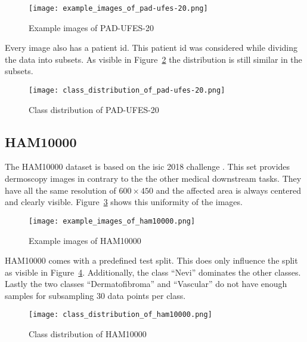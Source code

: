 \begin{figure}[H]
    \begin{center}
    \texttt{[image: example\_images\_of\_pad-ufes-20.png]}
    \caption{Example images of PAD-UFES-20}\label{fig:example_images_of_pad-ufes-20}
    \end{center}
\end{figure}

Every image also has a patient id. This patient id was considered while dividing the data into subsets. 
As visible in Figure~\ref{fig:class_distribution_of_pad-ufes-20} the distribution is still similar in the subsets. 

\begin{figure}[H]
    \begin{center}
    \texttt{[image: class\_distribution\_of\_pad-ufes-20.png]}
    \caption{Class distribution of PAD-UFES-20}\label{fig:class_distribution_of_pad-ufes-20}
    \end{center}
\end{figure}


\subsection{HAM10000}
The HAM10000 dataset is based on the \gls{isic} 2018 challenge \autocite{codella2019}. 
This set provides dermoscopy images in contrary to the the other medical downstream tasks.
They have all the same resolution of $600 \times 450$ and the affected area is always centered and clearly visible.
Figure~\ref{fig:example_images_of_ham10000} shows this uniformity of the images. 
\begin{figure}[H]
    \begin{center}
    \texttt{[image: example\_images\_of\_ham10000.png]}
    \caption{Example images of HAM10000}\label{fig:example_images_of_ham10000}
    \end{center}
\end{figure}
HAM10000 comes with a predefined test split. This does only influence the split as visible in Figure~\ref{fig:class_distribution_of_ham10000}.
Additionally, the class ``Nevi'' dominates the other classes. 
Lastly the two classes ``Dermatofibroma'' and ``Vascular'' do not have enough samples for subsampling 30 data points per class.
\begin{figure}[H]
    \begin{center}
    \texttt{[image: class\_distribution\_of\_ham10000.png]}
    \caption{Class distribution of HAM10000}\label{fig:class_distribution_of_ham10000}
    \end{center}
\end{figure}

